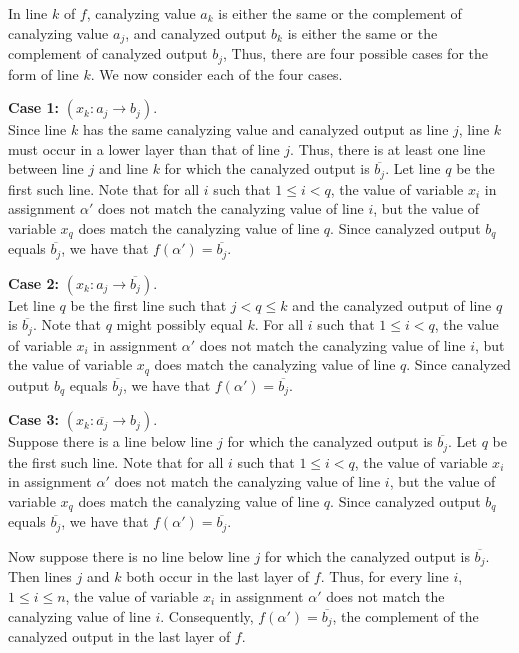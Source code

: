 In line $k$ of $f$, canalyzing value $a_k$ is either the same or
the complement of canalyzing value $a_j$, and canalyzed output $b_k$
is either the same or the complement of canalyzed output $b_j$,
Thus, there are four possible cases for the form of line $k$.  We
now consider each of the four cases.

\noindent
{\bf Case 1:} $(x_k : a_j \rightarrow b_j)$. \\ 

Since line $k$ has
the same canalyzing value and canalyzed output as line $j$, line
$k$ must occur in a lower layer than that of line $j$.  Thus, there
is at least one line between line $j$ and line $k$ for which the
canalyzed output is $\overline{b_j}$.  Let line $q$ be the first
such line.  Note that for all $i$ such that $1 \leq i < q$, the
value of variable $x_i$ in assignment $\alpha'$ does not match the
canalyzing value of line $i$, but the value of variable $x_q$ does
match the canalyzing value of line $q$.  Since canalyzed output
$b_q$ equals $\overline{b_j}$, we have that $f(\alpha') =
\overline{b_j}$.

\noindent
{\bf Case 2:} $(x_k : a_j \rightarrow \overline{b_j})$. \\ 

Let line
$q$ be the first line such that $j < q \leq k$ and the canalyzed
output of line $q$ is $\overline{b_j}$.  Note that $q$ might possibly
equal $k$.  For all $i$ such that $1 \leq i < q$, the value of
variable $x_i$ in assignment $\alpha'$ does not match the canalyzing
value of line $i$, but the value of variable $x_q$ does match the
canalyzing value of line $q$.  Since canalyzed output $b_q$ equals
$\overline{b_j}$, we have that $f(\alpha') = \overline{b_j}$.

\noindent
{\bf Case 3:} $(x_k : \overline{a_j} \rightarrow b_j)$. \\ 

Suppose there is a line below line $j$ for which the canalyzed output is
$\overline{b_j}$.  Let $q$ be the first such line.  Note that for
all $i$ such that $1 \leq i < q$, the value of variable $x_i$ in
assignment $\alpha'$ does not match the canalyzing value of line
$i$, but the value of variable $x_q$ does match the canalyzing value
of line $q$.  Since canalyzed output $b_q$ equals $\overline{b_j}$,
we have that $f(\alpha') = \overline{b_j}$.

Now suppose there is no line below line $j$ for which the canalyzed
output is $\overline{b_j}$.  Then lines $j$ and $k$ both occur in
the last layer of $f$.  Thus, for every line $i$, $1 \leq i \leq
n$, the value of variable $x_i$ in assignment $\alpha'$ does not
match the canalyzing value of line $i$.  Consequently, $f(\alpha')
= \overline{b_j}$, the complement of the canalyzed output in the
last layer of $f$.

